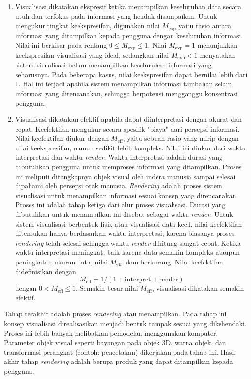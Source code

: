 \begin{enumerate}
    \item Visualisasi dikatakan ekspresif ketika menampilkan keseluruhan data secara utuh dan terfokus pada informasi yang hendak disampaikan. Untuk mengukur tingkat keekspresifan, digunakan nilai $M_{\text{exp}}$ yaitu rasio antara informasi yang ditampilkan kepada pengguna dengan keseluruhan informasi. Nilai ini berkisar pada rentang $0 \leq M_{\text{exp}} \leq 1$. Nilai $M_{\text{exp}}=1$ menunjukkan keekspresifan visualisasi yang ideal, sedangkan nilai $M_{\text{exp}} < 1$ menyatakan sistem visualisasi belum menampilkan keseluruhan informasi yang seharusnya. Pada beberapa kasus, nilai keekspresifan dapat bernilai lebih dari 1. Hal ini terjadi apabila sistem menampilkan informasi tambahan selain informasi yang direncanakan, sehingga berpotensi mengganggu konsentrasi pengguna.
    \item Visualisasi dikatakan efektif apabila dapat diinterpretasi dengan akurat dan cepat. Keefektifan mengukur secara spesifik "biaya" dari persepsi informasi. Nilai keefektifan diukur dengan $M_{\text{eff}}$, yaitu sebuah rasio yang mirip dengan nilai keekspresifan, namun sedikit lebih kompleks. Nilai ini diukur dari waktu interpretasi dan waktu \textit{render}. Waktu interpretasi adalah durasi yang dibutuhkan pengguna untuk memproses informasi yang ditampilkan. Proses ini meliputi ditangkapnya objek visual oleh indera manusia sampai selesai dipahami oleh persepsi otak manusia. \textit{Rendering} adalah proses sistem visualisasi untuk menampilkan informasi sesuai konsep yang direncanakan. Proses ini adalah tahap ketiga dari alur proses visualisasi. Durasi yang dibutuhkan untuk menampilkan ini disebut sebagai waktu \textit{render}. Untuk sistem visualisasi berbentuk fisik atau visualisasi data kecil, nilai keefektifan ditentukan hanya berdasarkan waktu interpretasi, karena biasanya proses \textit{rendering} telah selesai sehingga waktu \textit{render} dihitung sangat cepat. Ketika waktu interpretasi meningkat, baik karena data semakin kompleks ataupun peningkatan ukuran data, nilai $M_{\text{eff}}$ akan berkurang. Nilai keefektifan didefinisikan dengan \begin{equation}
        M_\text{eff}=1/\left(1+\text{interpret}+\text{render}\right)
    \end{equation} dengan $0 < M_{\text{eff}}\leq 1$. Semakin besar nilai $M_{\text{eff}}$, visualisasi dikatakan semakin efektif.
\end{enumerate}

Tahap terakhir adalah proses \textit{rendering} atau menampilkan. Pada tahap ini konsep visualisasi direalisasikan menjadi bentuk tampak sesuai yang dikehendaki. Proses ini lebih banyak melibatkan pemodelan menggunakan komputer. Parameter objek visual seperti bayangan pada objek 3D, warna objek, dan transformasi perangkat (contoh: pencetakan) dikerjakan pada tahap ini. Hasil akhir tahap \textit{rendering} adalah berupa produk yang dapat ditampilkan kepada pengguna. \par 

